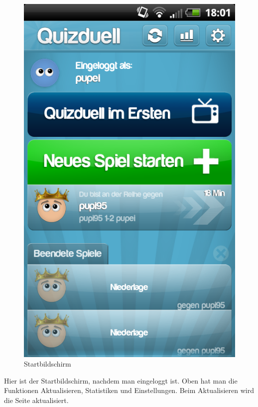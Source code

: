 \documentclass[fontsize=12pt,paper=a4,twoside]{scrartcl}
\begin{document}
\begin{figure}[H]
\centering
\includegraphics[scale=0.5]{Bilder/start.png}
\caption{Startbildschirm}
\end{figure}

Hier ist der Startbildschirm, nachdem man eingeloggt ist. Oben hat man die Funktionen Aktualisieren, Statistiken und Einstellungen. Beim Aktualisieren wird die Seite aktualisiert. \\
\end{document}
